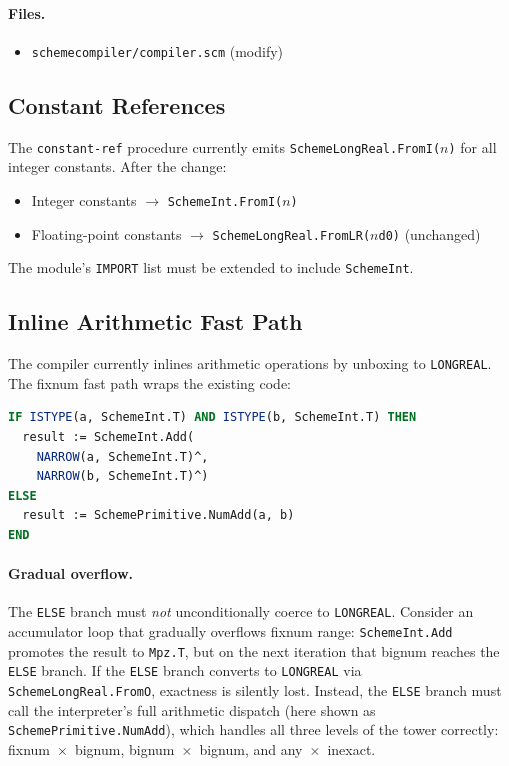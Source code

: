 \documentclass[12pt]{article}
\begin{document}
\paragraph{Files.}
\begin{itemize}[nosep]
\item {\tt schemecompiler/compiler.scm} (modify)
\end{itemize}

\subsection{Constant References}

The {\tt constant-ref} procedure currently emits
{\tt SchemeLongReal.FromI($n$)} for all integer constants.
After the change:

\begin{itemize}[nosep]
\item Integer constants $\to$ {\tt SchemeInt.FromI($n$)}
\item Floating-point constants $\to$ {\tt SchemeLongReal.FromLR($n$d0)}
  (unchanged)
\end{itemize}

\noindent The module's {\tt IMPORT} list must be extended to include
{\tt SchemeInt}.

\subsection{Inline Arithmetic Fast Path}

The compiler currently inlines arithmetic operations by unboxing
to {\tt LONGREAL}.  The fixnum fast path wraps the existing code:

\begin{lstlisting}[language=Modula3]
IF ISTYPE(a, SchemeInt.T) AND ISTYPE(b, SchemeInt.T) THEN
  result := SchemeInt.Add(
    NARROW(a, SchemeInt.T)^,
    NARROW(b, SchemeInt.T)^)
ELSE
  result := SchemePrimitive.NumAdd(a, b)
END
\end{lstlisting}

\paragraph{Gradual overflow.}
The {\tt ELSE} branch must \emph{not} unconditionally coerce to
{\tt LONGREAL}.  Consider an accumulator loop that gradually
overflows fixnum range: {\tt SchemeInt.Add} promotes the result
to {\tt Mpz.T}, but on the next iteration that bignum reaches
the {\tt ELSE} branch.  If the {\tt ELSE} branch converts to
{\tt LONGREAL} via {\tt SchemeLongReal.FromO}, exactness is
silently lost.  Instead, the {\tt ELSE} branch must call the
interpreter's full arithmetic dispatch (here shown as
{\tt SchemePrimitive.NumAdd}), which handles all three levels
of the tower correctly: fixnum~$\times$~bignum,
bignum~$\times$~bignum, and any~$\times$~inexact.
\end{document}
